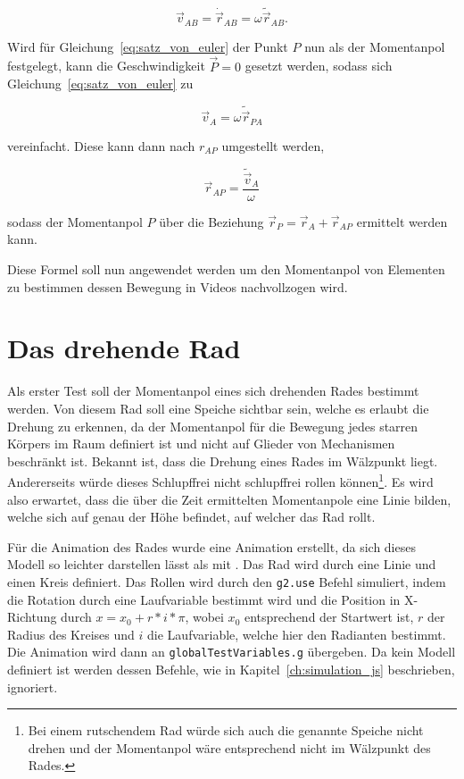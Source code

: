 \begin{equation}
    \vec{v}_{AB} = \dot{\vec{r}}_{AB} = \omega \tilde{\vec{r}}_{AB}.
    \label{eq:absolut_zu_winkel}
\end{equation}

Wird für Gleichung~\ref{eq:satz_von_euler} der Punkt $P$ nun als der Momentanpol festgelegt, kann die Geschwindigkeit $\vec{P} = 0$ gesetzt werden,
sodass sich Gleichung~\ref{eq:satz_von_euler} zu

\begin{equation}
    \vec{v}_A = \omega \tilde{\vec{r}}_{PA}
    \label{eq:satz_von_euler_momentanpol}
\end{equation}

vereinfacht. 
Diese kann dann nach $r_{AP}$ umgestellt werden,

\begin{equation}
    \vec{r}_{AP} = \frac{\tilde{\vec{v}}_A}{\omega}
    \label{eq:euler_rAP}
\end{equation}

sodass der Momentanpol $P$ über die Beziehung $\vec{r}_P = \vec{r}_A + \vec{r}_{AP}$ ermittelt werden kann.

Diese Formel soll nun angewendet werden um den Momentanpol von Elementen zu bestimmen dessen Bewegung in Videos nachvollzogen wird.

\section{Das drehende Rad}\label{ch:drehendesRad}

Als erster Test soll der Momentanpol eines sich drehenden Rades bestimmt werden.
Von diesem Rad soll eine Speiche sichtbar sein, welche es erlaubt die Drehung zu erkennen, da der Momentanpol für die Bewegung jedes starren Körpers im Raum definiert ist und nicht auf Glieder von Mechanismen beschränkt ist.
Bekannt ist, dass die Drehung eines Rades im Wälzpunkt liegt.
Andererseits würde dieses Schlupffrei nicht schlupffrei rollen können\footnote{Bei einem rutschendem Rad würde sich auch die genannte Speiche nicht drehen und der Momentanpol wäre entsprechend nicht im Wälzpunkt des Rades.}.
Es wird also erwartet, dass die über die Zeit ermittelten Momentanpole eine Linie bilden, welche sich auf genau der Höhe befindet, auf welcher das Rad rollt.

Für die Animation des Rades wurde eine  Animation erstellt,
da sich dieses Modell so leichter darstellen lässt als mit .
Das Rad wird durch eine Linie und einen Kreis definiert.
Das Rollen wird durch den \lstinline{g2.use} Befehl simuliert, indem die Rotation durch eine Laufvariable bestimmt wird und die Position in X-Richtung durch $x = x_0 + r * i * \pi$, wobei $x_0$ entsprechend der Startwert ist, $r$ der Radius des Kreises und $i$ die Laufvariable, welche hier den Radianten bestimmt.
Die Animation wird dann an \lstinline{globalTestVariables.g} übergeben.
Da kein  Modell definiert ist werden dessen Befehle, wie in Kapitel~\ref{ch:simulation_js} beschrieben, ignoriert.

